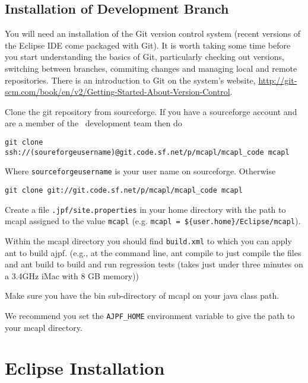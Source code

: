 \subsection{Installation of Development Branch}

You will need an installation of the Git version control system (recent versions of the Eclipse IDE come packaged with Git).  It is worth taking some time before you start understanding the basics of Git, particularly checking out versions, switching between branches, commiting changes and managing local and remote repositories.  There is an introduction to Git on the system's website, \url{http://git-scm.com/book/en/v2/Getting-Started-About-Version-Control}.

\begin{itemize}
\begin{sloppypar}
\item Clone the git repository from sourceforge.  If you have a sourceforge account and are a member of the \ajpf\ development team then do
\begin{small}
\begin{verbatim}
git clone ssh://(soureforgeusername)@git.code.sf.net/p/mcapl/mcapl_code mcapl
\end{verbatim}
\end{small}
Where \texttt{sourceforgeusername} is your user name on sourceforge.  Otherwise
\begin{verbatim}
git clone git://git.code.sf.net/p/mcapl/mcapl_code mcapl
\end{verbatim}
\end{sloppypar}
\item Create a file \texttt{.jpf/site.properties} in your home directory with the path to mcapl assigned to the value \texttt{mcapl} (e.g. \texttt{mcapl = \$\{user.home\}/Eclipse/mcapl}).
\item Within the mcapl directory you should find \texttt{build.xml} to which you can apply ant to build ajpf. (e.g., at the command line, ant compile to just compile the files and ant build to build and run regression tests (takes just under three minutes on a 3.4GHz iMac with 8 GB memory))
\item Make sure you have the bin sub-directory of mcapl on your java class path.
\item We recommend you set the \texttt{AJPF\_HOME} environment variable to give the path to your mcapl directory.
\end{itemize}

\section{Eclipse Installation}

